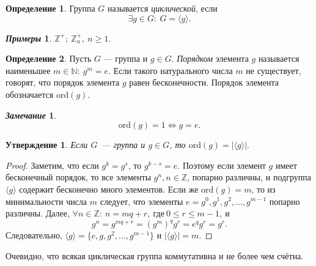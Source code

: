 \documentclass[a4paper, 14pt]{extarticle}
\newcommand{\integers}{\mathbb{Z}}
\newcommand{\naturals}{\mathbb{N}}
\newcommand{\ord}{\mathrm{ord}}
\newcommand{\suchthat}{{:}{ } \ }
\theoremstyle{definition}
\newtheorem*{exmpls}{\textit{Примеры}}
\newtheorem*{remark}{\textit{Замечание}}
\newtheorem{definition}{Определение}
\theoremstyle{plain}
\numberwithin{theorem}{section}
\numberwithin{definition}{section}
\newtheorem{statement}{Утверждение}
\numberwithin{statement}{section}
\numberwithin{lemma}{section}
\numberwithin{consequence}{section}
\begin{document}
	\begin{definition}
		Группа $G$ называется \textit{циклической}, если 
		\begin{equation*}
			\exists g \in G \suchthat G = \langle g \rangle.
		\end{equation*}
	\end{definition}
	\begin{exmpls}
		${\integers ^ +; \ \integers_n ^ +, \ n \geqslant 1.}$
	\end{exmpls}
	\begin{definition}
		Пусть $G$ — группа и ${g \in G}$. \textit{Порядком} элемента $g$ называется наименьшее ${m \in \naturals \suchthat g^m = e}$. Если такого натурального числа $m$ не существует, говорят, что порядок элемента $g$ равен бесконечности. Порядок элемента обозначается $\ord(g)$.
	\end{definition}
	\begin{remark}
		\begin{equation*}
			\ord(g) = 1 \Longleftrightarrow g = e.
		\end{equation*}
		
	\end{remark}
	\begin{statement}
		Если $G$~--- группа и $g \in G$, то $\ord(g) = |\langle g \rangle|.$
	\end{statement}
	\begin{proof}
		Заметим, что если $g^k = g^s$, то $g^{k - s} = e$. Поэтому если элемент $g$ имеет бесконечный порядок, то все элементы $g^n, n \in \integers$, попарно различны, и подгруппа $\langle g \rangle$ содержит бесконечно много элементов. 
		Если же ${\ord(g) = m}$, то из минимальности числа $m$ следует, что элементы ${e = g^0, g^1, g^2, \ldots , g^{m-1}}$ попарно различны.
		Далее, ${\forall n \in \integers\suchthat n = mq + r, \ \text{где} \ 0 \leqslant r \leq m - 1, \ \text{и}}$
		\begin{equation*}
			g^n = g^{mq + r} = (g^m)^q g^r = e^q g^r = g^r.
		\end{equation*}
		Следовательно, $\langle g \rangle = \{e, g, g^2, \ldots, g^{m - 1}\}$ и $|\langle g \rangle| = m.$
	\end{proof}
	Очевидно, что всякая циклическая группа коммутативна и не более чем счётна.
	\newpage
\end{document}
